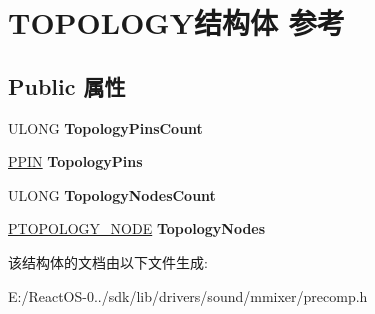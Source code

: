 \hypertarget{struct_t_o_p_o_l_o_g_y}{}\section{T\+O\+P\+O\+L\+O\+G\+Y结构体 参考}
\label{struct_t_o_p_o_l_o_g_y}
\subsection*{Public 属性}
\begin{DoxyCompactItemize}
\item 
\mbox{\label{struct_t_o_p_o_l_o_g_y_a1a0df1081abf28d964785f0b739647cd}} 
U\+L\+O\+NG {\bfseries Topology\+Pins\+Count}
\item 
\mbox{\label{struct_t_o_p_o_l_o_g_y_aa7cfab6c9f6fa5f260ad4403e00da65e}} 
\hyperlink{struct_p_i_n}{P\+P\+IN} {\bfseries Topology\+Pins}
\item 
\mbox{\label{struct_t_o_p_o_l_o_g_y_ac799c293241aca0cdf99435a81a60f69}} 
U\+L\+O\+NG {\bfseries Topology\+Nodes\+Count}
\item 
\mbox{\label{struct_t_o_p_o_l_o_g_y_a8c8cff9ae582b9dfa6006c28ab82399d}} 
\hyperlink{struct_____t_o_p_o_l_o_g_y___n_o_d_e____}{P\+T\+O\+P\+O\+L\+O\+G\+Y\+\_\+\+N\+O\+DE} {\bfseries Topology\+Nodes}
\end{DoxyCompactItemize}


该结构体的文档由以下文件生成\+:\begin{DoxyCompactItemize}
\item 
E\+:/\+React\+O\+S-\/0../sdk/lib/drivers/sound/mmixer/precomp.\+h\end{DoxyCompactItemize}
